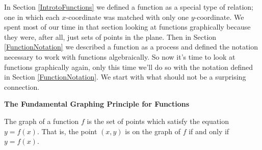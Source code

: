 

\setcounter{footnote}{0}

\label{GraphsofFunctions}

In Section \ref{IntrotoFunctions} we defined a function as a special type of relation; one in which each $x$-coordinate was matched with only one $y$-coordinate.  We spent most of our time in that section looking at functions graphically because they were, after all, just sets of points in the plane. Then in Section \ref{FunctionNotation} we described a function as a process and defined the notation necessary to work with functions algebraically.  So now it's time to look at functions graphically again, only this time we'll do so with the notation defined in Section \ref{FunctionNotation}.  We start with what should not be a surprising connection.

\medskip

\colorbox{ResultColor}{\bbm


\centerline{\textbf{The Fundamental Graphing Principle for Functions}}

\label{fgpff}   

\smallskip

The graph of a function $f$ is the set of points which satisfy the equation $y=f(x)$.  That is, the point $(x,y)$ is on the graph of $f$ if and only if $y=f(x)$.

\ebm}

